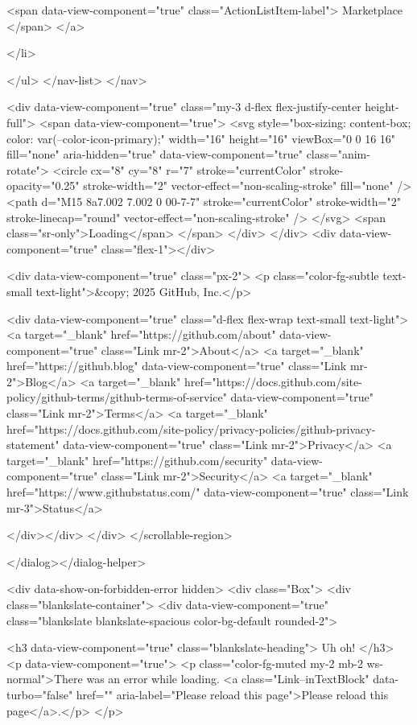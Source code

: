         <span data-view-component="true" class="ActionListItem-label">
          Marketplace
</span>      
</a>
  
</li>

</ul>  </nav-list>
</nav>

        <div data-view-component="true" class="my-3 d-flex flex-justify-center height-full">
          <span data-view-component="true">
  <svg style="box-sizing: content-box; color: var(--color-icon-primary);" width="16" height="16" viewBox="0 0 16 16" fill="none" aria-hidden="true" data-view-component="true" class="anim-rotate">
    <circle cx="8" cy="8" r="7" stroke="currentColor" stroke-opacity="0.25" stroke-width="2" vector-effect="non-scaling-stroke" fill="none" />
    <path d="M15 8a7.002 7.002 0 00-7-7" stroke="currentColor" stroke-width="2" stroke-linecap="round" vector-effect="non-scaling-stroke" />
</svg>    <span class="sr-only">Loading</span>
</span>
</div>
</div>
      <div data-view-component="true" class="flex-1"></div>


      <div data-view-component="true" class="px-2">      <p class="color-fg-subtle text-small text-light">&copy; 2025 GitHub, Inc.</p>

      <div data-view-component="true" class="d-flex flex-wrap text-small text-light">
          <a target="_blank" href="https://github.com/about" data-view-component="true" class="Link mr-2">About</a>
          <a target="_blank" href="https://github.blog" data-view-component="true" class="Link mr-2">Blog</a>
          <a target="_blank" href="https://docs.github.com/site-policy/github-terms/github-terms-of-service" data-view-component="true" class="Link mr-2">Terms</a>
          <a target="_blank" href="https://docs.github.com/site-policy/privacy-policies/github-privacy-statement" data-view-component="true" class="Link mr-2">Privacy</a>
          <a target="_blank" href="https://github.com/security" data-view-component="true" class="Link mr-2">Security</a>
          <a target="_blank" href="https://www.githubstatus.com/" data-view-component="true" class="Link mr-3">Status</a>

</div></div>
</div>
      </scrollable-region>
      
</dialog></dialog-helper>


  <div data-show-on-forbidden-error hidden>
    <div class="Box">
  <div class="blankslate-container">
    <div data-view-component="true" class="blankslate blankslate-spacious color-bg-default rounded-2">
      

      <h3 data-view-component="true" class="blankslate-heading">        Uh oh!
</h3>
      <p data-view-component="true">        <p class="color-fg-muted my-2 mb-2 ws-normal">There was an error while loading. <a class="Link--inTextBlock" data-turbo="false" href="" aria-label="Please reload this page">Please reload this page</a>.</p>
</p>

